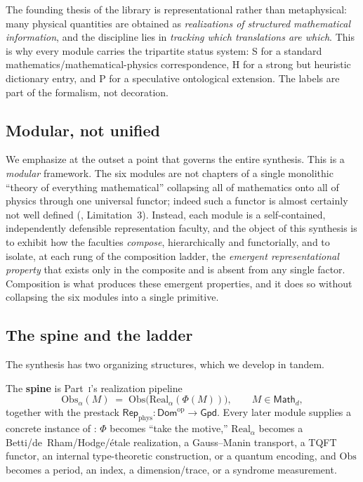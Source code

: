 \documentclass[12pt]{article}
\theoremstyle{definition}
\theoremstyle{remark}
\newcommand{\Dom}{\mathsf{Dom}}
\newcommand{\Math}{\mathsf{Math}}
\newcommand{\Gpd}{\mathsf{Gpd}}
\newcommand{\Real}{\mathrm{Real}}
\newcommand{\Obs}{\mathrm{Obs}}
\newcommand{\Repphys}{\mathsf{Rep}_{\mathrm{phys}}}
\newcommand{\op}{\mathrm{op}}
\newcommand{\Sstat}{\textsf{S}}
\newcommand{\Hstat}{\textsf{H}}
\newcommand{\Pstat}{\textsf{P}}
\newcommand{\PI}{\textsc{i}}
\begin{document}
The founding thesis of the library \cite{primary} is representational rather than
metaphysical: many physical quantities are obtained as \emph{realizations of
structured mathematical information}, and the discipline lies in \emph{tracking which
translations are which}.  This is why every module carries the tripartite status
system: \Sstat{} for a standard mathematics/mathematical-physics correspondence,
\Hstat{} for a strong but heuristic dictionary entry, and \Pstat{} for a speculative
ontological extension.  The labels are part of the formalism, not decoration.

\subsection{Modular, not unified}

We emphasize at the outset a point that governs the entire synthesis.  This is a
\emph{modular} framework.  The six modules are not chapters of a single monolithic
``theory of everything mathematical'' collapsing all of mathematics onto all of
physics through one universal functor; indeed such a functor is almost certainly not
well defined (, Limitation~3).  Instead, each module is a
self-contained, independently defensible representation faculty, and the object of
this synthesis is to exhibit how the faculties \emph{compose}, hierarchically and
functorially, and to isolate, at each rung of the composition ladder, the
\emph{emergent representational property} that exists only in the composite and is
absent from any single factor.  Composition is what produces these emergent
properties, and it does so without collapsing the six modules into a single primitive.

\subsection{The spine and the ladder}

The synthesis has two organizing structures, which we develop in tandem.

The \textbf{spine} is Part~\PI's realization pipeline
\begin{equation}
\label{eq:pipeline-intro}
\Obs_\alpha(M)\;=\;\Obs\bigl(\Real_\alpha(\Phi(M))\bigr),
\qquad M\in\Math_d,
\end{equation}
together with the prestack $\Repphys:\Dom^\op\to\Gpd$.  Every later module supplies a
concrete instance of : $\Phi$ becomes ``take the
motive,'' $\Real_\alpha$ becomes a Betti/de~Rham/Hodge/\'etale realization, a
Gauss--Manin transport, a TQFT functor, an internal type-theoretic construction, or a
quantum encoding, and $\Obs$ becomes a period, an index, a dimension/trace, or a
syndrome measurement.
\end{document}
